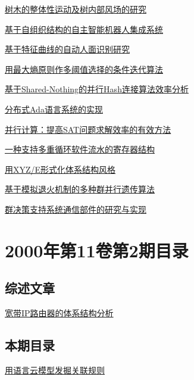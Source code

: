 \documentclass[a4paper]{article}
\begin{document}
\href{http://www.jos.org.cn/ch/reader/download_pdf.aspx?file_no=20000311&year_id=2000&quarter_id=3&falg=1}{树木的整体性运动及树内部风场的研究}

\href{http://www.jos.org.cn/ch/reader/download_pdf.aspx?file_no=20000312&year_id=2000&quarter_id=3&falg=1}{基于自组织结构的自主智能机器人集成系统}

\href{http://www.jos.org.cn/ch/reader/download_pdf.aspx?file_no=20000313&year_id=2000&quarter_id=3&falg=1}{基于特征曲线的自动人面识别研究}

\href{http://www.jos.org.cn/ch/reader/download_pdf.aspx?file_no=20000314&year_id=2000&quarter_id=3&falg=1}{用最大熵原则作多阈值选择的条件迭代算法}

\href{http://www.jos.org.cn/ch/reader/download_pdf.aspx?file_no=20000315&year_id=2000&quarter_id=3&falg=1}{基于Shared-Nothing的并行Hash连接算法效率分析}

\href{http://www.jos.org.cn/ch/reader/download_pdf.aspx?file_no=20000316&year_id=2000&quarter_id=3&falg=1}{分布式Ada语言系统的实现}

\href{http://www.jos.org.cn/ch/reader/download_pdf.aspx?file_no=20000317&year_id=2000&quarter_id=3&falg=1}{并行计算：提高SAT问题求解效率的有效方法}

\href{http://www.jos.org.cn/ch/reader/download_pdf.aspx?file_no=20000318&year_id=2000&quarter_id=3&falg=1}{一种支持多重循环软件流水的寄存器结构}

\href{http://www.jos.org.cn/ch/reader/download_pdf.aspx?file_no=20000319&year_id=2000&quarter_id=3&falg=1}{用XYZ/E形式化体系结构风格}

\href{http://www.jos.org.cn/ch/reader/download_pdf.aspx?file_no=20000320&year_id=2000&quarter_id=3&falg=1}{基于模拟退火机制的多种群并行遗传算法}

\href{http://www.jos.org.cn/ch/reader/download_pdf.aspx?file_no=20000321&year_id=2000&quarter_id=3&falg=1}{群决策支持系统通信部件的研究与实现}


\section{\textbf{2000年第11卷第2期目录}}
\subsection{综述文章}
\href{http://www.jos.org.cn/ch/reader/download_pdf.aspx?file_no=20000204&year_id=2000&quarter_id=2&falg=1}{宽带IP路由器的体系结构分析}

\subsection{本期目录}
\href{http://www.jos.org.cn/ch/reader/download_pdf.aspx?file_no=20000201&year_id=2000&quarter_id=2&falg=1}{用语言云模型发掘关联规则}
\end{document}
